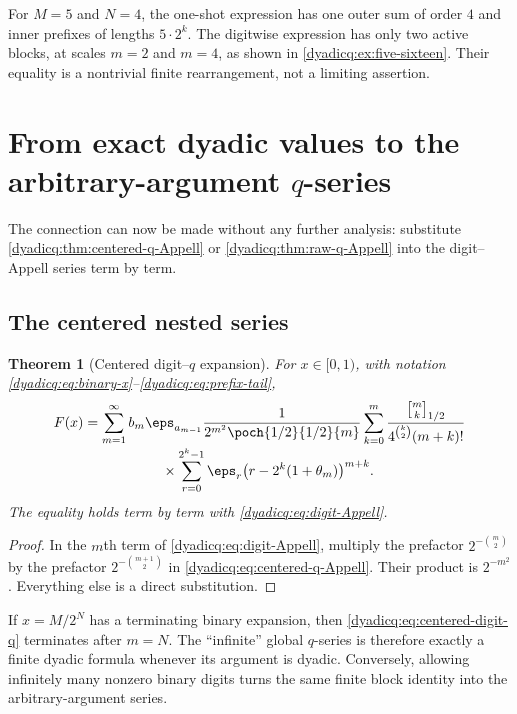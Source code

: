 \documentclass[11pt,oneside]{article}
\newtheorem{theorem}{Theorem}[section]
\theoremstyle{definition}
\theoremstyle{remark}
\newcommand{\qbinom}[3]{\genfrac{[}{]}{0pt}{}{#1}{#2}_{#3}}
\begin{document}
For $M=5$ and $N=4$, the one-shot expression has one outer sum of order $4$
and inner prefixes of lengths $5\cdot2^k$.  The digitwise expression has only
two active blocks, at scales $m=2$ and $m=4$, as shown in
\cref{dyadicq:ex:five-sixteen}.  Their equality is a nontrivial finite rearrangement,
not a limiting assertion.

\section{From exact dyadic values to the arbitrary-argument \texorpdfstring{$q$}{q}-series}

The connection can now be made without any further analysis: substitute
\cref{dyadicq:thm:centered-q-Appell} or \cref{dyadicq:thm:raw-q-Appell} into the digit--Appell
series term by term.

\subsection{The centered nested series}

\begin{theorem}[Centered digit--$q$ expansion]\label{dyadicq:thm:centered-digit-q}
For $x\in[0,1)$, with notation \eqref{dyadicq:eq:binary-x}--\eqref{dyadicq:eq:prefix-tail},
\begin{align}\label{dyadicq:eq:centered-digit-q}
 F(x)
 &=\sum_{m=1}^{\infty}
 b_m\eps_{a_{m-1}}
 \frac1{2^{m^2}\poch{1/2}{1/2}{m}}
 \sum_{k=0}^{m}
 \frac{\qbinom{m}{k}{1/2}}
 {4^{\binom k2}(m+k)!}
 \notag\\[-0.25em]
 &\hspace{5.6em}\times
 \sum_{r=0}^{2^k-1}
 \eps_r\bigl(r-2^k(1+\theta_m)\bigr)^{m+k}.
\end{align}
The equality holds term by term with \eqref{dyadicq:eq:digit-Appell}.
\end{theorem}

\begin{proof}
In the $m$th term of \eqref{dyadicq:eq:digit-Appell}, multiply the prefactor
$2^{-\binom m2}$ by the prefactor
$2^{-\binom{m+1}{2}}$ in \eqref{dyadicq:eq:centered-q-Appell}.  Their product is
$2^{-m^2}$.  Everything else is a direct substitution.
\end{proof}

If $x=M/2^N$ has a terminating binary expansion, then
\eqref{dyadicq:eq:centered-digit-q} terminates after $m=N$.  The ``infinite'' global
$q$-series is therefore exactly a finite dyadic formula whenever its argument
is dyadic.  Conversely, allowing infinitely many nonzero binary digits turns
the same finite block identity into the arbitrary-argument series.
\end{document}
